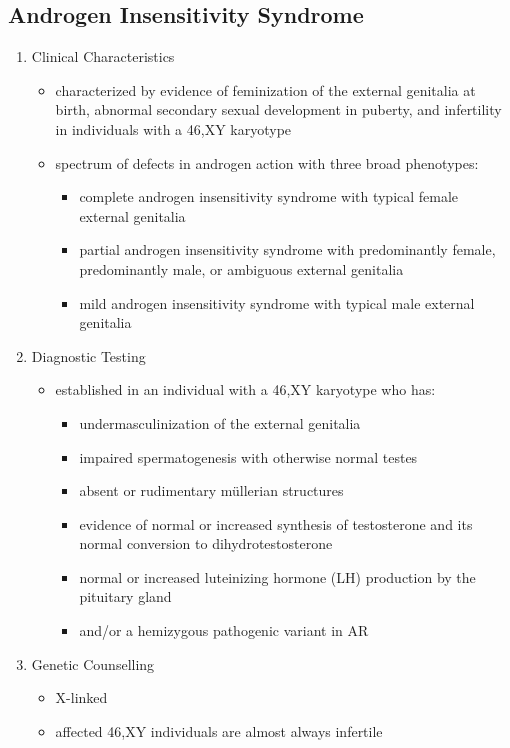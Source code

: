 \documentclass[12pt]{scrartcl}
\begin{document}
\subsection{Androgen Insensitivity Syndrome}
\label{sec:org4aa985f}
\begin{enumerate}
\item Clinical Characteristics
\label{sec:org467bbdf}
\begin{itemize}
\item characterized by evidence of feminization of the external genitalia
at birth, abnormal secondary sexual development in puberty, and
infertility in individuals with a 46,XY karyotype
\item spectrum of defects in androgen action with three broad phenotypes:
\begin{itemize}
\item complete androgen insensitivity syndrome with typical
female external genitalia
\item partial androgen insensitivity syndrome with predominantly
female, predominantly male, or ambiguous external genitalia
\item mild androgen insensitivity syndrome with typical male external
genitalia
\end{itemize}
\end{itemize}
\item Diagnostic Testing
\label{sec:org7768514}
\begin{itemize}
\item established in an individual with a 46,XY karyotype who has:
\begin{itemize}
\item undermasculinization of the external genitalia
\item impaired spermatogenesis with otherwise normal testes
\item absent or rudimentary müllerian structures
\item evidence of normal or increased synthesis of testosterone and its
normal conversion to dihydrotestosterone
\item normal or increased luteinizing hormone (LH) production by the
pituitary gland
\item and/or a hemizygous pathogenic variant in AR
\end{itemize}
\end{itemize}
\item Genetic Counselling
\label{sec:orge7077b3}
\begin{itemize}
\item X-linked
\item affected 46,XY individuals are almost always infertile
\end{itemize}
\end{enumerate}
\end{document}
